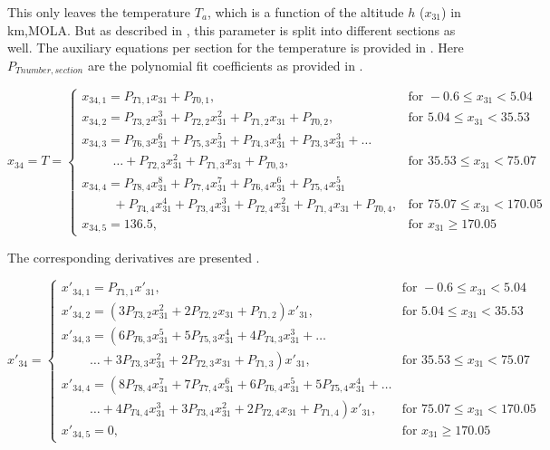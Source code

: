 This only leaves the temperature $T_{a}$, which is a function of the altitude $h$ ($x_{31}$) in km,\ac{MOLA}. But as described in , this parameter is split into different sections as well. The auxiliary equations per section for the temperature is provided in . Here $P_{T number,section}$ are the polynomial fit coefficients as provided in .

\begin{equation}\label{eq:tempCondAux}
x_{34}=T=\begin{cases}
x_{34,1}=P_{T 1,1}x_{31}+P_{T 0,1}, & \text{for } -0.6 \leq x_{31} < 5.04  \\
x_{34,2}=P_{T 3,2}x_{31}^{3}+P_{T 2,2}x_{31}^{2}+P_{T 1,2}x_{31}+P_{T 0,2}, &  \text{for } 5.04 \leq x_{31} < 35.53   \\
x_{34,3}=P_{T 6,3}x_{31}^{6}+P_{T 5,3}x_{31}^{5}+P_{T 4,3}x_{31}^{4}+P_{T 3,3}x_{31}^{3}+ \dots \\
\qquad\ \ \dotsc +P_{T 2,3}x_{31}^{2}+P_{T 1,3}x_{31}+P_{T 0,3}, &  \text{for } 35.53 \leq x_{31} < 75.07   \\
x_{34,4}=P_{T 8,4}x_{31}^{8}+P_{T 7,4}x_{31}^{7}+P_{T 6,4}x_{31}^{6}+P_{T 5,4}x_{31}^{5} \\
\qquad\ \ +P_{T 4,4}x_{31}^{4}+P_{T 3,4}x_{31}^{3}+P_{T 2,4}x_{31}^{2}+P_{T 1,4}x_{31}+P_{T 0,4}, &  \text{for } 75.07 \leq x_{31} < 170.05   \\
x_{34,5}=136.5, &  \text{for }  x_{31} \geq 170.05   
\end{cases}
\end{equation}

The corresponding derivatives are presented .

\begin{equation}\label{eq:TCondDerAux}
x'_{34}=\begin{cases}
x'_{34,1}=P_{T 1,1}x'_{31}, & \text{for } -0.6 \leq x_{31} < 5.04  \\
x'_{34,2}=\left(3P_{T 3,2}x_{31}^{2}+2P_{T 2,2}x_{31}+P_{T 1,2}\right)x'_{31}, &  \text{for } 5.04\leq x_{31} < 35.53   \\
x'_{34,3}=\left(6 P_{T 6,3}x_{31}^{5}+5P_{T 5,3}x_{31}^{4}+4P_{T 4,3}x_{31}^{3}+ \dots
\right. \\
\qquad\  \left. \dotsc +3P_{T 3,3}x_{31}^{2}+2P_{T 2,3}x_{31}+P_{T 1,3}\right)x'_{31}, &  \text{for } 35.53\leq x_{31} < 75.07   \\
x'_{34,4}=\left(8 P_{T 8,4}x_{31}^{7}+7P_{T 7,4}x_{31}^{6}+6P_{T 6,4}x_{31}^{5}
+5P_{T 5,4}x_{31}^{4}+ \dots \right. \\
\qquad\  \left. \dotsc +4P_{T 4,4}x_{31}^{3}+3P_{T 3,4}x_{31}^{2}+2P_{T 2,4}x_{31}+P_{T 1,4}\right)x'_{31}, &  \text{for } 75.07\leq x_{31} < 170.05   \\
x'_{34,5}=0, &  \text{for }  x_{31} \geq 170.05   
\end{cases}
\end{equation}



